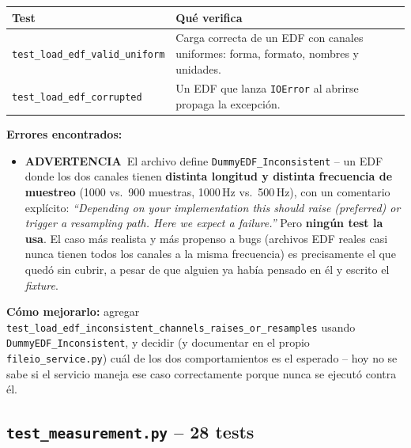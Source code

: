\documentclass[11pt,a4paper]{article}
\newcommand{\warnmark}{\textcolor{advertencia}{\textbf{ADVERTENCIA}}}
\begin{document}
\begin{center}
\begin{longtable}{L{5.5cm}L{9cm}}
\toprule
\textbf{Test} & \textbf{Qué verifica} \\
\midrule
\endhead
\texttt{test\_\allowbreak load\_\allowbreak edf\_\allowbreak valid\_\allowbreak uniform} & Carga correcta de un EDF con canales uniformes: forma, formato, nombres y unidades. \\
\texttt{test\_\allowbreak load\_\allowbreak edf\_\allowbreak corrupted} & Un EDF que lanza \texttt{IOError} al abrirse propaga la excepción. \\
\bottomrule
\end{longtable}
\end{center}

\textbf{Errores encontrados:}
\begin{itemize}
  \item \warnmark\ El archivo define \texttt{DummyEDF\_\allowbreak Inconsistent} -- un EDF donde los dos canales tienen
        \textbf{distinta longitud y distinta frecuencia de muestreo} (1000 vs.\ 900 muestras, 1000\,Hz vs.\
        500\,Hz), con un comentario explícito: \textit{``Depending on your implementation this should raise
        (preferred) or trigger a resampling path. Here we expect a failure.''} Pero \textbf{ningún test la
        usa}. El caso más realista y más propenso a bugs (archivos EDF reales casi nunca tienen todos los
        canales a la misma frecuencia) es precisamente el que quedó sin cubrir, a pesar de que alguien ya
        había pensado en él y escrito el \textit{fixture}.
\end{itemize}

\textbf{Cómo mejorarlo:} agregar
\texttt{test\_\allowbreak load\_\allowbreak edf\_\allowbreak inconsistent\_\allowbreak channels\_\allowbreak raises\_\allowbreak or\_\allowbreak resamples} usando
\texttt{DummyEDF\_\allowbreak Inconsistent}, y decidir (y documentar en el propio \texttt{fileio\_\allowbreak service.py}) cuál de
los dos comportamientos es el esperado -- hoy no se sabe si el servicio maneja ese caso correctamente porque
nunca se ejecutó contra él.

\subsection{\texttt{test\_\allowbreak measurement.py} -- 28 tests}
\end{document}
